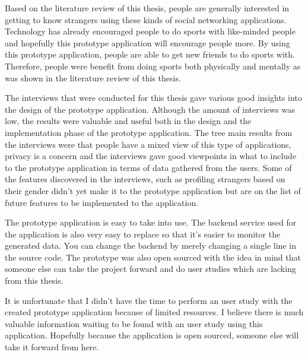 Based on the literature review of this thesis, people are generally interested in getting to know strangers using these kinds of social networking applications. Technology has already encouraged people to do sports with like-minded people and hopefully this prototype application will encourage people more. By using this prototype application, people are able to get new friends to do sports with. Therefore, people were benefit from doing sports both physically and mentally as was shown in the literature review of this thesis.

The interviews that were conducted for this thesis gave various good insights into the design of the prototype application. Although the amount of interviews was low, the results were valuable and useful both in the design and the implementation phase of the prototype application. The tree main results from the interviews were that people have a mixed view of this type of applications, privacy is a concern and the interviews gave good viewpoints in what to include to the prototype application in terms of data gathered from the users. Some of the features discovered in the interviews, such as profiling strangers based on their gender didn't yet make it to the prototype application but are on the list of future features to be implemented to the application.

The prototype application is easy to take into use. The backend service used for the application is also very easy to replace so that it's easier to monitor the generated data. You can change the backend by merely changing a single line in the source code. The prototype was also open sourced with the idea in mind that someone else can take the project forward and do user studies which are lacking from this thesis.

It is unfortunate that I didn't have the time to perform an user study with the created prototype application because of limited resources. I believe there is much valuable information waiting to be found with an user study using this application. Hopefully because the application is open sourced, someone else will take it forward from here.


